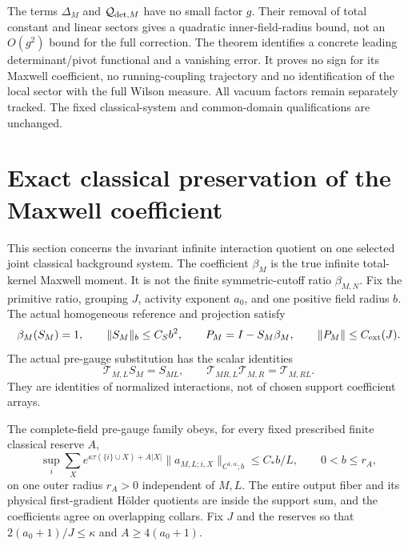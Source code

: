 \documentclass[11pt]{article}
\theoremstyle{remark}
\begin{document}
The terms $\Delta_M$ and $\mathcal Q_{{\rm det},M}$ have no
small factor $g$. Their removal of total constant and linear
sectors gives a quadratic inner-field-radius bound, not an
$O(g^2)$ bound for the full correction.
The theorem identifies a concrete leading determinant/pivot
functional and a vanishing error. It proves no sign for its
Maxwell coefficient, no running-coupling trajectory and no
identification of the local sector with the full Wilson measure.
All vacuum factors remain separately tracked. The fixed
classical-system and common-domain qualifications are unchanged.


\section{Exact classical preservation of the Maxwell coefficient}
\label{cmt-section}

This section concerns the invariant infinite interaction quotient
on one selected joint classical background system. The coefficient
\(\beta_M\) is the true infinite total-kernel Maxwell moment.
It is not the finite symmetric-cutoff ratio \(\beta_{M,N}\).
Fix the primitive ratio, grouping \(J\), activity exponent \(a_0\),
and one positive field radius \(b\). The actual homogeneous
reference and projection satisfy
\begin{equation}
 \beta_M(S_M)=1,\qquad \|S_M\|_b\le C_Sb^2,\qquad
 P_M=I-S_M\beta_M,\qquad \|P_M\|\le C_{\rm ext}(J).
 \label{cmt-reference}
\end{equation}
The actual pre-gauge substitution has the scalar identities
\begin{equation}
 \mathcal T_{M,L}S_M=S_{ML},\qquad
 \mathcal T_{MR,L}\mathcal T_{M,R}
                       =\mathcal T_{M,RL}.
 \label{cmt-semigroup}
\end{equation}
They are identities of normalized interactions, not of chosen
support coefficient arrays.

The complete-field pre-gauge family obeys, for every fixed
prescribed finite classical reserve \(A\),
\begin{equation}
 \sup_i\sum_X e^{\kappa\tau(\{i\}\cup X)+A|X|}
       \|a_{M,L;i,X}\|_{C^{1,\alpha};b}
           \le C_* b/L,\qquad 0<b\le r_A,
 \label{cmt-uniform-family}
\end{equation}
on one outer radius \(r_A>0\) independent of \(M,L\).
The entire output fiber and its physical first-gradient
H\"older quotients are inside the support sum, and the
coefficients agree on overlapping collars. Fix \(J\) and
the reserves so that \(2(a_0+1)/J\le\kappa\) and
\(A\ge4(a_0+1)\).
\end{document}
